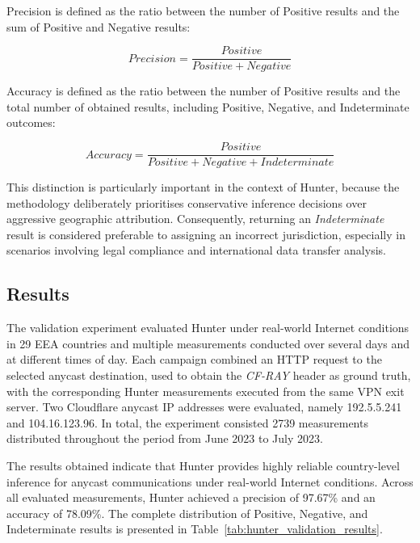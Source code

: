 \documentclass[
A4paper,                %
twoside,                %
openright,              %
chapterprefix=true,     %
12pt,                   %
headings=normal,        %
titlepage=on            %
]{book}
\begin{document}
Precision is defined as the ratio between the number of Positive results and the sum of Positive and Negative results:

\begin{equation*}
    Precision = \frac{Positive}{Positive + Negative}
\end{equation*}

Accuracy is defined as the ratio between the number of Positive results and the total number of obtained results, including Positive, Negative, and Indeterminate outcomes:

\begin{equation*}
    Accuracy = \frac{Positive}{Positive + Negative + Indeterminate}
\end{equation*}

This distinction is particularly important in the context of Hunter, because the methodology deliberately prioritises conservative inference decisions over aggressive geographic attribution. Consequently, returning an \textit{Indeterminate} result is considered preferable to assigning an incorrect jurisdiction, especially in scenarios involving legal compliance and international data transfer analysis.

\subsection{Results}

The validation experiment evaluated Hunter under real-world Internet conditions in 29 EEA countries and multiple measurements conducted over several days and at different times of day. Each campaign combined an HTTP request to the selected anycast destination, used to obtain the \textit{CF-RAY} header as ground truth, with the corresponding Hunter measurements executed from the same VPN exit server. Two Cloudflare anycast IP addresses were evaluated, namely 192.5.5.241 and 104.16.123.96. In total, the experiment consisted 2739 measurements distributed throughout the period from June 2023 to July 2023.

The results obtained indicate that Hunter provides highly reliable country-level inference for anycast communications under real-world Internet conditions. Across all evaluated measurements, Hunter achieved a precision of 97.67\% and an accuracy of 78.09\%. The complete distribution of Positive, Negative, and Indeterminate results is presented in Table~\ref{tab:hunter_validation_results}.
\end{document}
